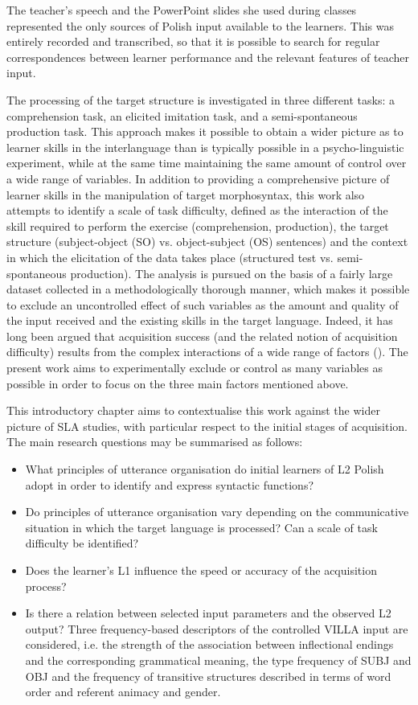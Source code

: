 The teacher’s speech and the PowerPoint slides she used during classes represented the only sources of Polish input available to the learners. This was entirely recorded and transcribed, so that it is possible to search for regular correspondences between learner performance and the relevant features of teacher input.

The processing of the target structure is investigated in three different tasks: a comprehension task, an elicited imitation task, and a semi-spontaneous production task. This approach makes it possible to obtain a wider picture as to learner skills in the interlanguage than is typically possible in a psycho-linguistic experiment, while at the same time maintaining the same amount of control over a wide range of variables. In addition to providing a comprehensive picture of learner skills in the manipulation of target morphosyntax, this work also attempts to identify a scale of task difficulty, defined as the interaction of the skill required to perform the exercise (comprehension, production), the target structure (subject-object (SO) vs. object-subject (OS) sentences) and the context in which the elicitation of the data takes place (structured test vs. semi-spontaneous production). The analysis is pursued on the basis of a fairly large dataset collected in a methodologically thorough manner, which makes it possible to exclude an uncontrolled effect of such variables as the amount and quality of the input received and the existing skills in the target language. Indeed, it has long been argued that acquisition success (and the related notion of acquisition difficulty) results from the complex interactions of a wide range of factors (\citealt{HousenSimoens2016}). The present work aims to experimentally exclude or control as many variables as possible in order to focus on the three main factors mentioned above.

This introductory chapter aims to contextualise this work against the wider picture of SLA studies, with particular respect to the initial stages of acquisition. The main research questions may be summarised as follows:

\begin{itemize}
    \item What principles of utterance organisation do initial learners of L2 Polish adopt in order to identify and express syntactic functions?
    \item Do principles of utterance organisation vary depending on the communicative situation in which the target language is processed? Can a scale of task difficulty be identified?
    \item Does the learner’s L1 influence the speed or accuracy of the acquisition process?
    \item Is there a relation between selected input parameters and the observed L2 output? Three frequency-based descriptors of the controlled VILLA input are considered, i.e. the strength of the association between inflectional endings and the corresponding grammatical meaning, the type frequency of SUBJ and OBJ and the frequency of transitive structures described in terms of word order and referent animacy and gender.
\end{itemize}

